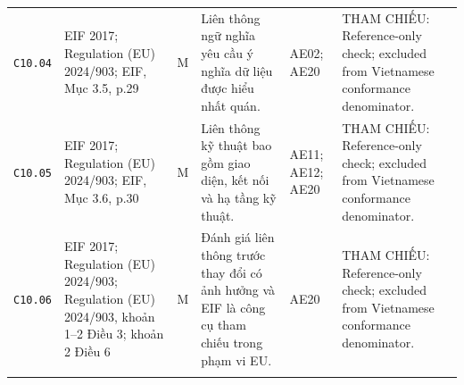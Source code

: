 \begin{longtable}{@{}p{0.9cm}p{3.0cm}p{0.55cm}p{4.05cm}p{2.0cm}p{3.45cm}@{}}
\texttt{C10.04} & EIF 2017; Regulation (EU) 2024/903; EIF, Mục 3.5, p.29 & M & Liên thông ngữ nghĩa yêu cầu ý nghĩa dữ liệu được hiểu nhất quán. & AE02; AE20 & THAM CHIẾU: Reference-only check; excluded from Vietnamese conformance denominator. \\ \addlinespace[1pt]
\texttt{C10.05} & EIF 2017; Regulation (EU) 2024/903; EIF, Mục 3.6, p.30 & M & Liên thông kỹ thuật bao gồm giao diện, kết nối và hạ tầng kỹ thuật. & AE11; AE12; AE20 & THAM CHIẾU: Reference-only check; excluded from Vietnamese conformance denominator. \\ \addlinespace[1pt]
\texttt{C10.06} & EIF 2017; Regulation (EU) 2024/903; Regulation (EU) 2024/903, khoản 1--2 Điều 3; khoản 2 Điều 6 & M & Đánh giá liên thông trước thay đổi có ảnh hưởng và EIF là công cụ tham chiếu trong phạm vi EU. & AE20 & THAM CHIẾU: Reference-only check; excluded from Vietnamese conformance denominator. \\ \addlinespace[1pt]
\end{longtable}\endgroup
